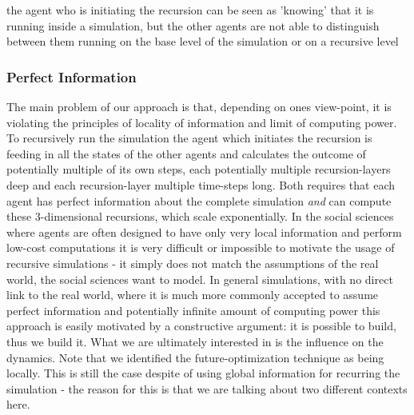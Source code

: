 the agent who is initiating the recursion can be seen as 'knowing' that it is running inside a simulation, but the other agents are not able to distinguish between them running on the base level of the simulation or on a recursive level

\subsubsection{Perfect Information}
The main problem of our approach is that, depending on ones view-point, it is violating the principles of locality of information and limit of computing power. To recursively run the simulation the agent which initiates the recursion is feeding in all the states of the other agents and calculates the outcome of potentially multiple of its own steps, each potentially multiple recursion-layers deep and each recursion-layer multiple time-steps long. Both requires that each agent has perfect information about the complete simulation \textit{and} can compute these 3-dimensional recursions, which scale exponentially.
In the social sciences where agents are often designed to have only very local information and perform low-cost computations it is very difficult or impossible to motivate the usage of recursive simulations - it simply does not match the assumptions of the real world, the social sciences want to model.
In general simulations, with no direct link to the real world, where it is much more commonly accepted to assume perfect information and potentially infinite amount of computing power this approach is easily motivated by a constructive argument: it is possible to build, thus we build it.
What we are ultimately interested in is the influence on the dynamics.
Note that we identified the future-optimization technique as being locally. This is still the case despite of using global information for recurring the simulation - the reason for this is that we are talking about two different contexts here.

